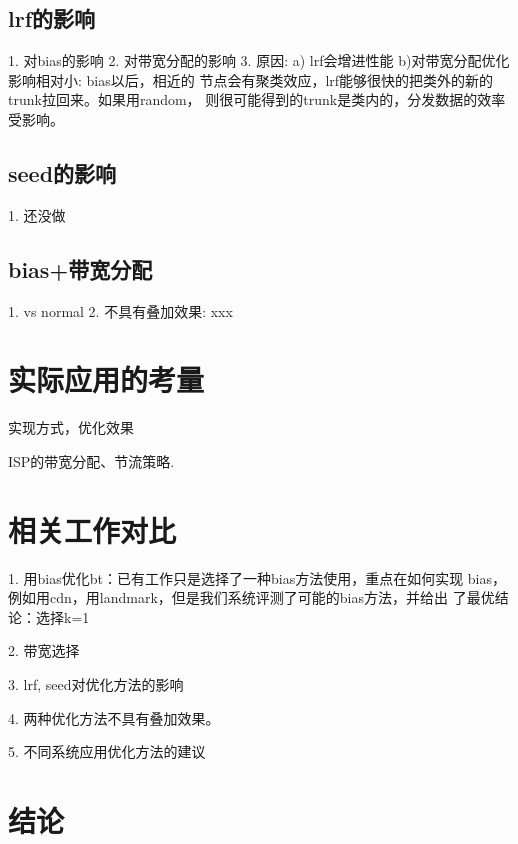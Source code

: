 \subsection{lrf的影响}
1. 对bias的影响
2. 对带宽分配的影响
3. 原因: a) lrf会增进性能 b)对带宽分配优化影响相对小: bias以后，相近的
节点会有聚类效应，lrf能够很快的把类外的新的trunk拉回来。如果用random，
则很可能得到的trunk是类内的，分发数据的效率受影响。


\subsection{seed的影响}
1. 还没做

\subsection{bias+带宽分配}
1. vs normal
2. 不具有叠加效果: xxx

\section{实际应用的考量}
实现方式，优化效果

ISP的带宽分配、节流策略.

\section{相关工作对比}

1. 用bias优化bt：已有工作只是选择了一种bias方法使用，重点在如何实现
bias，例如用cdn，用landmark，但是我们系统评测了可能的bias方法，并给出
了最优结论：选择k=1

2. 带宽选择

3. lrf, seed对优化方法的影响

4. 两种优化方法不具有叠加效果。

5. 不同系统应用优化方法的建议

\section{结论}
